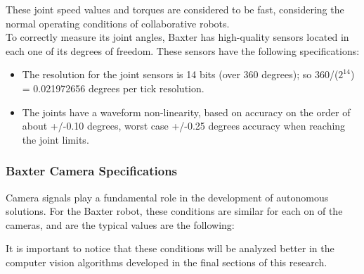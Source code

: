 \documentclass[11pt]{report} %
\begin{document}
These joint speed values and torques are considered to be fast, considering the normal operating conditions of collaborative robots.\\

To correctly measure its joint angles, Baxter has high-quality sensors located in each one of its degrees of freedom. These sensors have the following specifications:

\begin{itemize}
    \item The resolution for the joint sensors is 14 bits (over 360 degrees); so 360/($2^{14}$) = 0.021972656 degrees per tick resolution.
    \item The joints have a waveform non-linearity, based on accuracy on the order of about +/-0.10 degrees, worst case +/-0.25 degrees accuracy when reaching the joint limits.
\end{itemize}

\subsubsection{Baxter Camera Specifications}

Camera signals play a fundamental role in the development of autonomous solutions. For the Baxter robot, these conditions are similar for each on of the cameras, and are the typical values are the following:

\begin{table}[H]
\begin{center}
\caption{\label{tab:camera_specifications} Camera specifications for Baxter robot. Adapted from \citep{cite_baxter_hardware_specifications}.}
\end{center}
\end{table}

It is important to notice that these conditions will be analyzed better in the computer vision algorithms developed in the final sections of this research.\\
\end{document}
